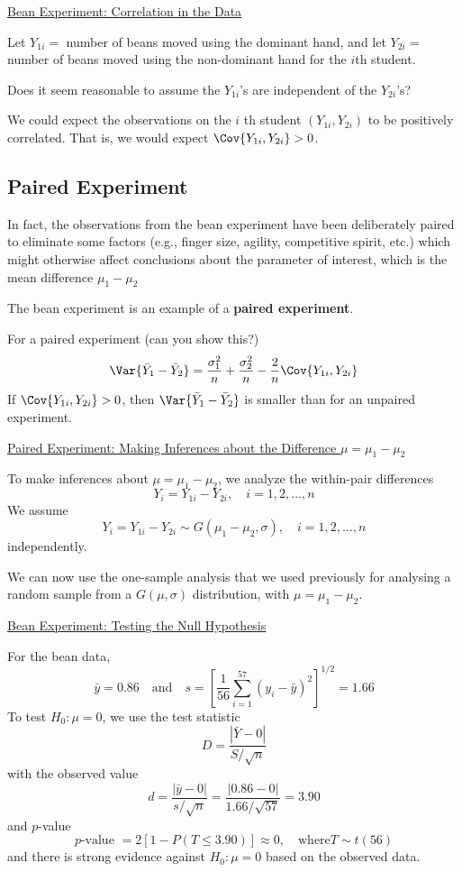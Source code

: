 \underline{Bean Experiment: Correlation in the Data}

Let $ Y_{1i}= $ number of beans moved using the dominant hand, and let $ Y_{2i}= $
number of beans moved using the non-dominant hand for the $ i $th student.

Does it seem reasonable to assume the $ Y_{1i} $'s are independent of the $ Y_{2i} $'s?

We could expect the observations on the $i$ th student
$\left(Y_{1 i}, Y_{2 i}\right)$ to be positively correlated.
That is, we would expect $\Cov{Y_{1 i}, Y_{2 i}}>0$.

\subsection{Paired Experiment}
In fact, the observations from the bean experiment have been deliberately paired to eliminate some factors
(e.g., finger size, agility, competitive spirit, etc.) which might otherwise affect conclusions about the parameter of interest, which is the mean difference $\mu_{1}-\mu_{2}$

The bean experiment is an example of a \textbf{paired experiment}.

For a paired experiment (can you show this?)
\[ \Var{\bar{Y}_{1}-\bar{Y}_{2}}
    =\frac{\sigma_{1}^{2}}{n}+\frac{\sigma_{2}^{2}}{n}-\frac{2}{n} \Cov{Y_{1 i}, Y_{2 i}} \]
If
$\Cov{Y_{1 i}, Y_{2 i}}>0 $,
then $\Var{\bar{Y}_{1}-\bar{Y}_{2}}$ is smaller than for an unpaired experiment.

\underline{Paired Experiment: Making Inferences about the Difference $ \mu=\mu_1-\mu_2 $}

To make inferences about $\mu=\mu_{1}-\mu_{2}$, we analyze the within-pair differences
\[Y_{i}=Y_{1 i}-Y_{2 i}, \quad i=1,2, \ldots, n\]
We assume
\[ Y_{i}=Y_{1 i}-Y_{2 i} \sim G\left(\mu_{1}-\mu_{2}, \sigma\right), \quad i=1,2, \ldots, n \]
independently.

We can now use the one-sample analysis that we used previously for analysing
a random sample from a $G(\mu, \sigma)$ distribution, with $\mu=\mu_{1}-\mu_{2}$.

\underline{Bean Experiment: Testing the Null Hypothesis}

For the bean data,
\[ \bar{y}=0.86 \quad \text{and} \quad s=\left[\frac{1}{56} \sum_{i=1}^{57}\left(y_{i}-\bar{y}\right)^{2}\right]^{1 / 2}=1.66 \]
To test $ H_0:\mu=0 $, we use the test statistic
\[D=\frac{|\bar{Y}-0|}{S / \sqrt{n}}\]
with the observed value
\[d=\frac{|\bar{y}-0|}{s / \sqrt{n}}=\frac{|0.86-0|}{1.66 / \sqrt{57}}=3.90\]
and $p$-value
\[p \text{-value }=2[1-P(T \leq 3.90)] \approx 0, \quad \text{where} T \sim t(56)\]
and there is strong evidence against $H_{0}: \mu=0$ based on the observed data.

